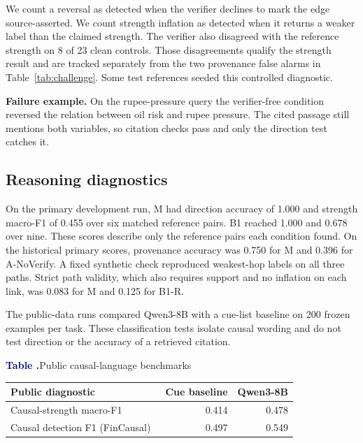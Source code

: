 \documentclass[11pt,a4paper]{article}
\newcommand{\runninglabel}{}
\newcommand{\reportflow}[1]{\renewcommand{\runninglabel}{#1}}
\newcommand{\tablehead}[1]{\textbf{#1}}
\newcounter{reporttable}
\newenvironment{reporttable}[1]{%
  \par\addvspace{14pt}\noindent\begin{minipage}{\linewidth}
  \refstepcounter{reporttable}%
  {\rmfamily\fontsize{10.5}{13.5}\selectfont
    \textcolor{Navy}{\bfseries Table \thereporttable.}\enspace #1}\par\vspace{8pt}%
  \rmfamily\fontsize{10.2}{13.5}\selectfont
  \renewcommand{\arraystretch}{1.26}%
  \setlength{\tabcolsep}{9pt}%
  \arrayrulecolor{Rule}%
}{%
  \end{minipage}\par\addvspace{13pt}%
}
\begin{document}
We count a reversal as detected when the verifier declines to mark the
edge source-asserted. We count strength inflation as detected when it
returns a weaker label than the claimed strength. The verifier also
disagreed with the reference strength on 8 of 23 clean controls. Those
disagreements qualify the strength result and are tracked separately
from the two provenance false alarms in Table~\ref{tab:challenge}.
Some test references seeded this controlled diagnostic.

\textbf{Failure example.} On the rupee-pressure query the verifier-free
condition reversed the relation between oil risk and rupee pressure. The
cited passage still mentions both variables, so citation checks pass and
only the direction test catches it.

\reportflow{Evaluation: Reasoning and Tools}

\subsection{Reasoning diagnostics}\label{reasoning-diagnostics}

On the primary development run, M had direction accuracy of 1.000 and
strength macro-F1 of 0.455 over six matched reference pairs. B1 reached
1.000 and 0.678 over nine. These scores describe only the reference
pairs each condition found. On the historical primary scores, provenance
accuracy was 0.750 for M and 0.396 for A-NoVerify. A fixed synthetic
check reproduced weakest-hop labels on all three paths. Strict path
validity, which also requires support and no inflation on each link, was
0.083 for M and 0.125 for B1-R.

The public-data runs compared Qwen3-8B with a cue-list baseline on 200
frozen examples per task. These classification tests isolate causal
wording and do not test direction or the accuracy of a retrieved
citation.

\begin{reporttable}{Public causal-language benchmarks}
\begin{tabularx}{\linewidth}{@{}L{1}rr@{}}
\toprule
\tablehead{Public diagnostic} & \tablehead{Cue baseline} & \tablehead{Qwen3-8B} \\
\midrule
Causal-strength macro-F1~\cite{yu2019} & 0.414 & 0.478 \\
Causal detection F1 (FinCausal)~\cite{mariko2020} & 0.497 & 0.549 \\
\bottomrule
\end{tabularx}
\end{reporttable}
\end{document}
